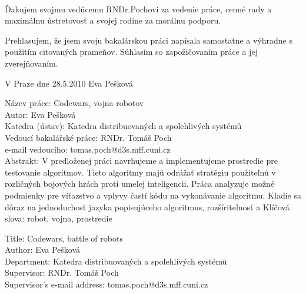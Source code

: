 \documentclass[12pt,notitlepage]{report}
\begin{document}
\normalsize %
\setcounter{page}{2} %

\ \vspace{10mm} 

\noindent Ďakujem svojmu vedúcemu RNDr.Pochovi za vedenie práce, cenné rady a maximálnu ústretovosť a svojej rodine za morálnu podporu. 

\vspace{\fill} %
\noindent Prehlasujem, že jsem svoju bakalárskou práci napísala samostatne a výhradne s použitím citovaných prameňov. Súhlasím so zapožičovaním práce a jej zverejňovaním.

\bigskip
\noindent V Praze dne 28.5.2010 \hspace{\fill}Eva Pešková\\ %


\tableofcontents

\newpage %

\noindent
Název práce: Codewars, vojna robotov\\
Autor: Eva Pešková\\
Katedra (ústav): Katedra distribuovaných a spolehlivých systémů\\
Vedoucí bakalářské práce: RNDr. Tomáš Poch\\
e-mail vedoucího: tomas.poch@d3s.mff.cuni.cz \\

\noindent Abstrakt: V predloženej práci navrhujeme a implementujeme prostredie pre testovanie algoritmov. Tieto algoritmy majú odrážať stratégiu použiteľnú  v rozličných bojových hrách proti umelej inteligencii. Práca analyzuje možné podmienky pre víťazstvo a vplyvy častí kódu na vykonávanie algoritmu. Kladie sa dôraz na jednoduchosť jazyka popisujúceho algoritmus, rozšíriteľnosť a 
\noindent Klíčová slova: robot, vojna, prostredie

\vspace{10mm}

\noindent
Title: Codewars, battle of robots\\
Author: Eva Pešková\\
Department: Katedra distribuovaných a spolehlivých systémů\\
Supervisor: RNDr. Tomáš Poch\\
Supervisor's e-mail address: tomas.poch@d3s.mff.cuni.cz \\
\end{document}
